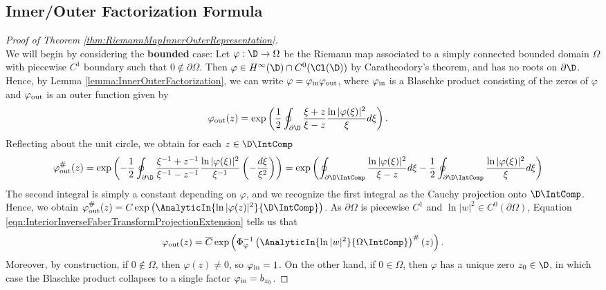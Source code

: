 \documentclass{article}
\numberwithin{equation}{section}
\begin{document}
\subsection{Inner/Outer Factorization Formula}
\begin{proof}[Proof of Theorem \ref{thm:RiemannMapInnerOuterRepresentation}]\label{proof:RiemannMapInnerOuterRepresentation}\;\\
We will begin by considering the {\bf bounded} case: Let $\varphi:\D\rightarrow\Omega$ be the Riemann map associated to a simply connected bounded domain $\Omega$ with piecewise $C^1$ boundary such that $0\notin\partial\Omega$. Then $\varphi\in H^\infty(\D)\cap C^{0}(\Cl(\D))$ by Caratheodory's theorem, and has no roots on $\partial\D$. Hence, by Lemma \ref{lemma:InnerOuterFactorization}, we can write $\varphi=\varphi_{\rm in}\varphi_{\rm out}$, where $\varphi_{\rm in}$ is a Blaschke product consisting of the zeros of $\varphi$ and $\varphi_{\rm out}$ is an outer function given by
\begin{align*}
    \varphi_{\rm out}(z)&=\exp\left(\dfrac{1}{2}\oint_{\partial\D}\dfrac{\xi+z}{\xi-z}\dfrac{\ln|\varphi(\xi)|^2}{\xi}d\xi\right).
\end{align*}
Reflecting about the unit circle, we obtain for each $z\in\D\IntComp$
\begin{align*}
    \varphi_{\rm out}^{\#}(z)&=\exp\left(-\dfrac{1}{2}\oint_{\partial\D}\dfrac{\xi^{-1}+z^{-1}}{\xi^{-1}-z^{-1}}\dfrac{\ln|\varphi(\xi)|^2}{\xi^{-1}}\left(-\dfrac{d\xi}{\xi^2}\right)\right)=\exp\left(\oint_{\partial\D\IntComp}\dfrac{\ln|\varphi(\xi)|^2}{\xi-z}d\xi-\dfrac{1}{2}\oint_{\partial\D\IntComp}\dfrac{\ln|\varphi(\xi)|^2}{\xi}d\xi\right)
\end{align*}
The second integral is simply a constant depending on $\varphi$, and we recognize the first integral as the Cauchy projection onto $\D\IntComp$. Hence, we obtain $\varphi_{\rm out}^{\#}(z)=C\exp\left(\AnalyticIn{\ln|\varphi(z)|^2}{\D\IntComp}\right)$. As $\partial\Omega$ is piecewise $C^1$ and $\ln|w|^2\in C^0(\partial\Omega)$, Equation \ref{eqn:InteriorInverseFaberTransformProjectionExtension} tells us that
$$\varphi_{\rm out}(z)=\overline{C}\exp\left(\Phi_{\varphi}^{-1}\left(\AnalyticIn{\ln|w|^2}{\Omega\IntComp}\right)^{\#}(z)\right).$$
Moreover, by construction, if $0\notin\Omega$, then $\varphi(z)\neq0$, so $\varphi_{\rm in}=1$. On the other hand, if $0\in\Omega$, then $\varphi$ has a unique zero $z_0\in\D$, in which case the Blaschke product collapses to a single factor $\varphi_{\rm in}=b_{z_0}$.


\end{proof}
\end{document}

